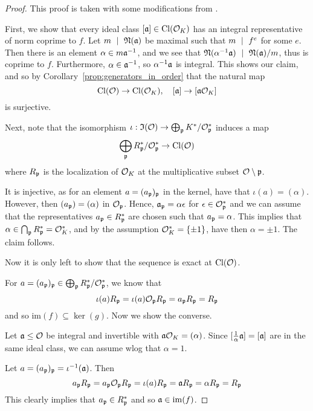 \begin{proof}
    This proof is taken with some modifications from \cite[Prop.~I.12.11]{neukirch}.

    First, we show that every ideal class $[\mathfrak{a}] \in \mathrm{Cl}(\mathcal{O}_K)$ has an integral representative of norm coprime to $f$.
    Let $m \ \mid \  \mathfrak{N}(\mathfrak{a})$ be maximal such that $m \ \mid \  f^e$ for some $e$.
    Then there is an element $\alpha \in m\mathfrak{a}^{-1}$, and we see that $\mathfrak{N}(\alpha^{-1}\mathfrak{a}) \ \mid \  \mathfrak{N}(\mathfrak{a})/m$, thus is coprime to $f$.
    Furthermore, $\alpha \in \mathfrak{a}^{-1}$, so $\alpha^{-1}\mathfrak{a}$ is integral.
    This shows our claim, and so by Corollary~\ref{prop:generators_in_order} that the natural map
    \begin{equation*}
        \mathrm{Cl}(\mathcal{O}) \to \mathrm{Cl}(\mathcal{O}_K), \quad [\mathfrak{a}] \to [\mathfrak{a}\mathcal{O}_K]
    \end{equation*}
    is surjective.

    Next, note that the isomorphism $\iota: \mathfrak{I}(\mathcal{O}) \to \bigoplus_{\mathfrak{p}} K^*/\mathcal{O}_{\mathfrak{p}}^*$ induces a map
    \begin{equation*}
        \bigoplus_{\mathfrak{p}} R_{\mathfrak{p}}^*/\mathcal{O}_{\mathfrak{p}}^* \to \mathrm{Cl}(\mathcal{O})
    \end{equation*}
    where $R_{\mathfrak{p}}$ is the localization of $\mathcal{O}_K$ at the multiplicative subset $\mathcal{O} \setminus \mathfrak{p}$.

    It is injective, as for an element $a = (a_{\mathfrak{p}})_{\mathfrak{p}}$ in the kernel, have that $\iota(a) = (\alpha)$.
    However, then $(a_{\mathfrak{p}}) = (\alpha)$ in $\mathcal{O}_{\mathfrak{p}}$.
    Hence, $\mathfrak{a}_{\mathfrak{p}} = \alpha\epsilon$ for $\epsilon \in \mathcal{O}_{\mathfrak{p}}^*$ and we can assume that the representatives $a_{\mathfrak{p}} \in R_{\mathfrak{p}}^*$ are chosen such that $a_{\mathfrak{p}} = \alpha$.
    This implies that $\alpha \in \bigcap_{\mathfrak{p}} R_{\mathfrak{p}}^* = \mathcal{O}_K^*$, and by the assumption $\mathcal{O}_K^* = \{ \pm 1 \}$, have then $\alpha = \pm 1$.
    The claim follows.

    Now it is only left to show that the sequence is exact at $\mathrm{Cl}(\mathcal{O})$.

    For $a = (a_{\mathfrak{p}})_{\mathfrak{p}} \in \bigoplus_{\mathfrak{p}} R_{\mathfrak{p}}^*/\mathcal{O}_{\mathfrak{p}}^*$, we know that
    \begin{equation*}
        \iota(a)R_{\mathfrak{p}} = \iota(a)\mathcal{O}_{\mathfrak{p}} R_{\mathfrak{p}} = a_{\mathfrak{p}} R_{\mathfrak{p}} = R_{\mathfrak{p}}
    \end{equation*}
    and so $\mathrm{im}(f) \subseteq \ker(g)$.
    Now we show the converse.

    Let $\mathfrak{a} \leq \mathcal{O}$ be integral and invertible with $\mathfrak{a}\mathcal{O}_K = (\alpha)$.
    Since $[\frac 1 \alpha \mathfrak{a}] = [\mathfrak{a}]$ are in the same ideal class, we can assume wlog that $\alpha = 1$.

    Let $a = (a_{\mathfrak{p}})_{\mathfrak{p}} = \iota^{-1}(\mathfrak{a})$.
    Then
    \begin{equation*}
        a_{\mathfrak{p}} R_{\mathfrak{p}} = a_{\mathfrak{p}}\mathcal{O}_{\mathfrak{p}} R_{\mathfrak{p}} = \iota(a)R_{\mathfrak{p}} = \mathfrak{a} R_{\mathfrak{p}} = \alpha R_{\mathfrak{p}} = R_{\mathfrak{p}}
    \end{equation*}
    This clearly implies that $a_{\mathfrak{p}} \in R_{\mathfrak{p}}^*$ and so $\mathfrak{a} \in \mathrm{im}(f)$.
\end{proof}
